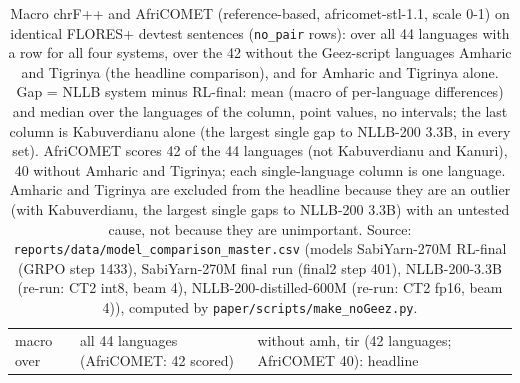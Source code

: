 \begin{table}[t]
\centering
\footnotesize
\setlength{\tabcolsep}{3pt}
\caption{Macro chrF++ and AfriCOMET (reference-based, africomet-stl-1.1, scale 0-1) on identical FLORES+ devtest sentences (\texttt{no\_pair} rows): over all 44 languages with a row for all four systems, over the 42 without the Ge\textquotesingle ez-script languages Amharic and Tigrinya (the headline comparison), and for Amharic and Tigrinya alone. Gap = NLLB system minus RL-final: mean (macro of per-language differences) and median over the languages of the column, point values, no intervals; the last column is Kabuverdianu alone (the largest single gap to NLLB-200 3.3B, in every set). AfriCOMET scores 42 of the 44 languages (not Kabuverdianu and Kanuri), 40 without Amharic and Tigrinya; each single-language column is one language. Amharic and Tigrinya are excluded from the headline because they are an outlier (with Kabuverdianu, the largest single gaps to NLLB-200 3.3B) with an untested cause, not because they are unimportant. Source: \texttt{reports/data/model\_comparison\_master.csv} (models \textquotesingle SabiYarn-270M RL-final (GRPO step 1433)\textquotesingle, \textquotesingle SabiYarn-270M final run (final2 step 401)\textquotesingle, \textquotesingle NLLB-200-3.3B (re-run: CT2 int8, beam 4)\textquotesingle, \textquotesingle NLLB-200-distilled-600M (re-run: CT2 fp16, beam 4)\textquotesingle), computed by \texttt{paper/scripts/make\_noGeez.py}.}
\label{tab:t_noGeez_flores}
{\def\LTcaptype{none} %
\begin{tabular}{@{}
  >{\raggedright\arraybackslash}p{}
  >{\raggedleft\arraybackslash}p{}
  >{\raggedleft\arraybackslash}p{}
  >{\raggedleft\arraybackslash}p{}
  >{\raggedleft\arraybackslash}p{}
  >{\raggedleft\arraybackslash}p{}@{}}
\toprule
\begin{minipage}[b]{\linewidth}\raggedright
macro over
\end{minipage} & \begin{minipage}[b]{\linewidth}\raggedleft
all 44 languages (AfriCOMET: 42 scored)
\end{minipage} & \begin{minipage}[b]{\linewidth}\raggedleft
without amh, tir (42 languages; AfriCOMET 40): headline
\end{minipage} & \begin{minipage}[b]{\linewidth}\raggedleft

\end{minipage}
\end{tabular}}
\end{table}
